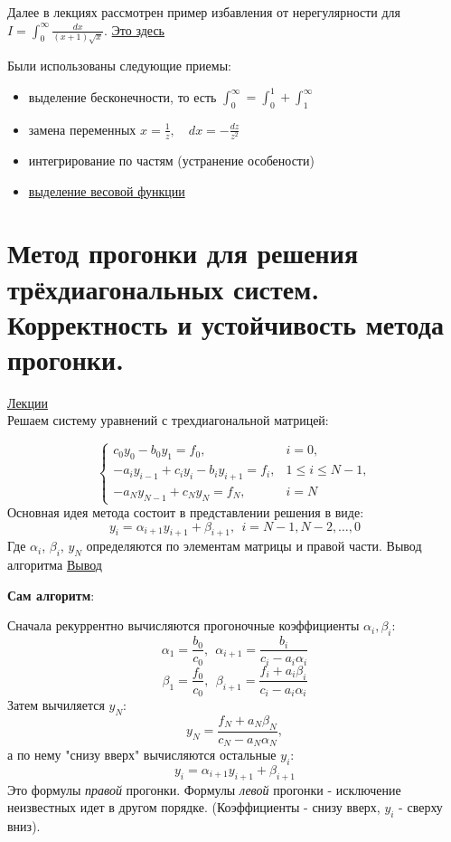 \documentclass[specialist, subf, href, colorlinks=true, 12pt, times, mtpro, final]{disser}
\theoremstyle{definition}
\begin{document}
    Далее в лекциях рассмотрен пример избавления от нерегулярности для $I = \int_0^{\infty} \frac{dx}{(x+1)\sqrt{x}}$. \hyperlink {lects.45}{Это здесь}
    
    Были использованы следующие приемы:
    \begin{itemize}
        \item выделение бесконечности, то есть $\int_0^{\infty} = \int_0^1 + \int_1^{\infty}$
        \item замена переменных $x = \frac{1}{z}, \quad dx = -\frac{dz}{z^2}$
        \item интегрирование по частям (устранение особености)
        \item \hyperlink {lects.46}{выделение весовой функции}
        
    \end{itemize}
    
\section {Метод прогонки для решения трёхдиагональных систем. Корректность и устойчивость метода прогонки.}
    \hyperlink {lects.48}{Лекции}\\
    Решаем систему уравнений с трехдиагональной матрицей:
    
    \begin{equation*}
     \begin{cases}
       c_0 y_0 - b_0 y_1 = f_0, &i = 0,\\
       -a_i y_{i-1} + c_i y_i - b_i y_{i+1} = f_i, &1 \le i \le N-1, \\
       -a_N y_{N-1} + c_N y_N = f_N, & i = N
     \end{cases}
    \end{equation*}
    Основная идея метода состоит в представлении решения в виде:
    $$y_i = \alpha_{i+1} y_{i+1} + \beta_{i+1}, \ \ i = N-1, N-2, \dots , 0$$
    Где $\alpha_i$, $\beta_i$, $y_N$ определяются по элементам матрицы и правой части.
    Вывод алгоритма \hyperlink {lects.48}{Вывод}
    
    {\bf Сам алгоритм}:
    
    Сначала рекуррентно вычисляются прогоночные коэффициенты $\alpha_i, \beta_i$:
    $$
       \alpha_1 = \frac{b_0}{c_0}, \ \ \alpha_{i+1} = \frac{b_i}{c_i - a_i \alpha_i}
    $$
    $$
       \beta_1 = \frac{f_0}{c_0}, \ \ \beta_{i+1} = \frac{f_i + a_i \beta_i}{c_i - a_i \alpha_i}
    $$
    Затем вычиляется $y_N$:
    $$
       y_N = \frac{f_N + a_N \beta_N}{c_N - a_N \alpha_N},
    $$
    а по нему "снизу вверх" вычисляются остальные $y_i$:
    $$
       y_i = \alpha_{i+1} y_{i+1} + \beta_{i+1}
    $$
    Это формулы \emph{правой} прогонки. Формулы \emph{левой} прогонки - исключение неизвестных идет в другом порядке. (Коэффициенты - снизу вверх, $y_i$ - сверху вниз).
\end{document}
